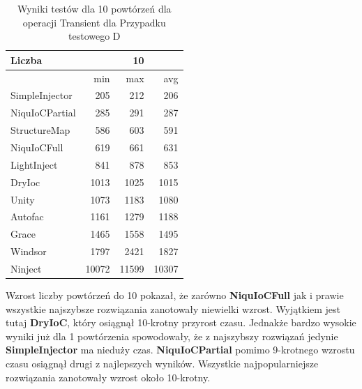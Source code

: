 \documentclass[12pt]{article}
\begin{document}
\begin{table}[H]
\captionsetup{belowskip=0pt,aboveskip=0pt}
\begin{center}
\begin{small}
	\begin{tabular}{ | l | r r r | }
    		\hline
Liczba & & 10 & \\ \hline
 & min & max & avg \\ \hline
SimpleInjector & 205 & 212 & 206 \\ \hline
NiquIoCPartial & 285 & 291 & 287 \\ \hline
StructureMap & 586 & 603 & 591 \\ \hline
NiquIoCFull & 619 & 661 & 631 \\ \hline
LightInject & 841 & 878 & 853 \\ \hline
DryIoc & 1013 & 1025 & 1015 \\ \hline
Unity & 1073 & 1183 & 1080 \\ \hline
Autofac & 1161 & 1279 & 1188 \\ \hline
Grace & 1465 & 1558 & 1495 \\ \hline
Windsor & 1797 & 2421 & 1827 \\ \hline
Ninject & 10072 & 11599 & 10307 \\ \hline
  	\end{tabular}
\end{small}
\end{center}
\caption{Wyniki testów dla 10 powtórzeń dla operacji Transient dla Przypadku testowego D}
\label{TestCaseD_Transient10}
\end{table}
Wzrost liczby powtórzeń do 10 pokazał, że zarówno \textbf{NiquIoCFull} jak i prawie wszystkie najszybsze rozwiązania zanotowały niewielki wzrost. Wyjątkiem jest tutaj \textbf{DryIoC}, który osiągnął 10-krotny przyrost czasu. Jednakże bardzo wysokie wyniki już dla 1 powtórzenia spowodowały, że z najszybszy rozwiązań jedynie \textbf{SimpleInjector} ma nieduży czas. \textbf{NiquIoCPartial} pomimo 9-krotnego wzrostu czasu osiągnął drugi z najlepszych wyników. Wszystkie najpopularniejsze rozwiązania zanotowały wzrost około 10-krotny.
\end{document}
